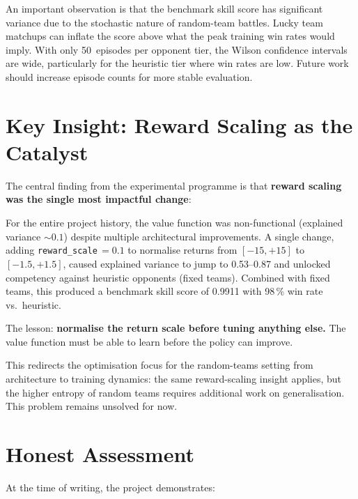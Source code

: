 An important observation is that the benchmark skill score has significant
variance due to the stochastic nature of random-team battles.  Lucky team
matchups can inflate the score above what the peak training win rates would
imply.  With only 50~episodes per opponent tier, the Wilson confidence
intervals are wide, particularly for the heuristic tier where win rates are
low.  Future work should increase episode counts for more stable evaluation.

\section{Key Insight: Reward Scaling as the Catalyst}

The central finding from the experimental programme is that \textbf{reward
scaling was the single most impactful change}:

\begin{keyinsight}
For the entire project history, the value function was non-functional
(explained variance ${\sim}0.1$) despite multiple architectural improvements.
A single change, adding \texttt{reward\_scale}$\,=0.1$ to normalise returns
from $[-15,+15]$ to $[-1.5,+1.5]$, caused explained variance to jump to
0.53--0.87 and unlocked competency against heuristic opponents (fixed teams).  Combined with
fixed teams, this produced a benchmark skill score of 0.9911 with 98\,\% win
rate vs.\ heuristic.

The lesson: \textbf{normalise the return scale before tuning anything else.}
The value function must be able to learn before the policy can improve.
\end{keyinsight}

This redirects the optimisation focus for the random-teams setting from
architecture to training dynamics: the same reward-scaling insight applies,
but the higher entropy of random teams requires additional work on
generalisation. This problem remains unsolved for now.

\section{Honest Assessment}

At the time of writing, the project demonstrates:

